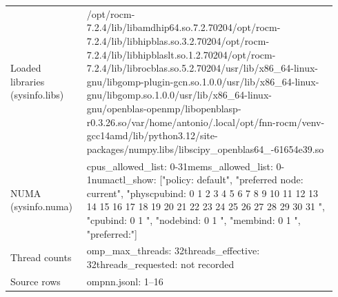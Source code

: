\begin{longtable}{>{\raggedright\arraybackslash}p{0.23\linewidth}>{\raggedright\arraybackslash}p{0.71\linewidth}}
Loaded libraries (sysinfo.libs) & /\allowbreak{}opt/\allowbreak{}rocm-7.2.4/\allowbreak{}lib/\allowbreak{}libamdhip64.so.7.2.70204\newline /\allowbreak{}opt/\allowbreak{}rocm-7.2.4/\allowbreak{}lib/\allowbreak{}libhipblas.so.3.2.70204\newline /\allowbreak{}opt/\allowbreak{}rocm-7.2.4/\allowbreak{}lib/\allowbreak{}libhipblaslt.so.1.2.70204\newline /\allowbreak{}opt/\allowbreak{}rocm-7.2.4/\allowbreak{}lib/\allowbreak{}librocblas.so.5.2.70204\newline /\allowbreak{}usr/\allowbreak{}lib/\allowbreak{}x86\_\allowbreak{}64-linux-gnu/\allowbreak{}libgomp-plugin-gcn.so.1.0.0\newline /\allowbreak{}usr/\allowbreak{}lib/\allowbreak{}x86\_\allowbreak{}64-linux-gnu/\allowbreak{}libgomp.so.1.0.0\newline /\allowbreak{}usr/\allowbreak{}lib/\allowbreak{}x86\_\allowbreak{}64-linux-gnu/\allowbreak{}openblas-openmp/\allowbreak{}libopenblasp-r0.3.26.so\newline /\allowbreak{}var/\allowbreak{}home/\allowbreak{}antonio/\allowbreak{}.local/\allowbreak{}opt/\allowbreak{}fnn-rocm/\allowbreak{}venv-gcc14amd/\allowbreak{}lib/\allowbreak{}python3.12/\allowbreak{}site-packages/\allowbreak{}numpy.libs/\allowbreak{}libscipy\_\allowbreak{}openblas64\_\allowbreak{}-61654e39.so \\
NUMA (sysinfo.numa) & cpus\_\allowbreak{}allowed\_\allowbreak{}list: 0-31\newline mems\_\allowbreak{}allowed\_\allowbreak{}list: 0-1\newline numactl\_\allowbreak{}show: ["policy: default", "preferred node: current", "physcpubind: 0 1 2 3 4 5 6 7 8 9 10 11 12 13 14 15 16 17 18 19 20 21 22 23 24 25 26 27 28 29 30 31 ", "cpubind: 0 1 ", "nodebind: 0 1 ", "membind: 0 1 ", "preferred:"] \\
Thread counts & omp\_\allowbreak{}max\_\allowbreak{}threads: 32\newline threads\_\allowbreak{}effective: 32\newline threads\_\allowbreak{}requested: not recorded \\
Source rows & ompnn.jsonl: 1–16 \\
\end{longtable}
